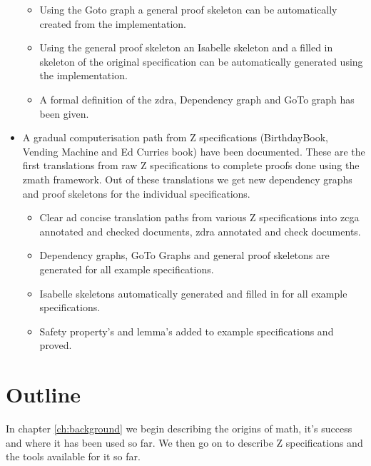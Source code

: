 \begin{itemize}
\begin{itemize}

\item Using the Goto graph a general proof skeleton can be automatically created from the implementation.

\item Using the general proof skeleton an Isabelle skeleton and a filled in skeleton of the original specification can be automatically generated using the implementation.

\item A formal definition of the \gls{zdra}, Dependency graph and GoTo graph has been given.
\end{itemize}

\item A gradual computerisation path from Z specifications (BirthdayBook, Vending Machine and Ed Curries book) have been documented. These are the first translations from raw Z specifications to complete proofs done using the \gls{zmath} framework. Out of these translations we get new dependency graphs and proof skeletons for the individual specifications.

\begin{itemize}
\item Clear ad concise translation paths from various Z specifications into \gls{zcga} annotated and checked documents, \gls{zdra} annotated and check documents.

\item Dependency graphs, GoTo Graphs and general proof skeletons are generated for all example specifications.

\item Isabelle skeletons automatically generated and filled in for all example specifications.

\item Safety property's and lemma's added to example specifications and proved.
\end{itemize}

\end{itemize}

\section{Outline}

In chapter \ref{ch:background} we begin describing the origins of \gls{math}, it's success and where it has been used so far. We then go on to describe Z specifications and the tools available for it so far.

